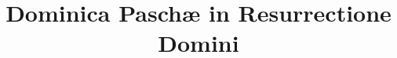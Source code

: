 \documentclass[17pt]{extarticle}
\begin{document}
\title{Dominica Paschæ in Resurrectione Domini}
\makereadingtitle

\end{document}
